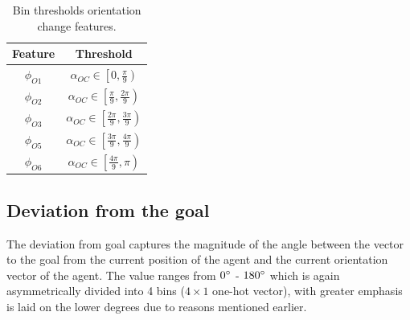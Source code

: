\begin{table}[htbp]
    \caption{Bin thresholds orientation change features.}
    \label{orientation-change-bins}
    \begin{center}
        \renewcommand{\arraystretch}{1.3}
        \begin{tabular}{|c|c|}
            \hline
            Feature & Threshold \\
            \hline
            $\phi_{O1}$ & $\alpha_{OC} \in \left[ 0 , \frac{\pi}{9} \right)$ \\
            
            $\phi_{O2}$ & $\alpha_{OC} \in \left[ \frac{\pi}{9} , \frac{2\pi}{9} \right)$ \\
            
            $\phi_{O3}$ & $\alpha_{OC} \in \left[ \frac{2\pi}{9} , \frac{3\pi}{9} \right)$ \\
    
            
            $\phi_{O5}$ & $\alpha_{OC} \in \left[ \frac{3\pi}{9} , \frac{4\pi}{9} \right)$ \\
            
            $\phi_{O6}$ & $\alpha_{OC} \in \left[ \frac{4\pi}{9} , \pi \right)$ \\
            \hline
        \end{tabular}
    \end{center}
\end{table}
\subsection*{Deviation from the goal}
The deviation from goal captures the magnitude of the angle between the vector to the goal from the current position of the agent and the current orientation vector of the agent. The value ranges from $0 \degree$ - $ 180 \degree$ which is again asymmetrically divided into 4 bins ($4 \times 1$ one-hot vector), with greater emphasis is laid on the lower degrees due to reasons mentioned earlier. 

